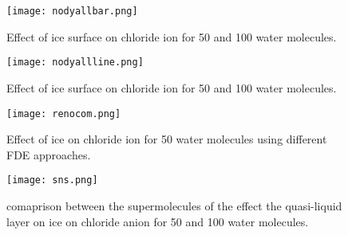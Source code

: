 \documentclass[a4paper,11pt]{report}
\begin{document}
\begin{figure}[H]\large
\texttt{[image: nodyallbar.png]}
\caption{Effect of ice surface on chloride ion for 50 and 100 water molecules.}
\label{figure45}
\end{figure}

\begin{figure}[H]\large
\texttt{[image: nodyallline.png]}
\caption{Effect of ice surface on chloride ion for 50 and 100 water molecules.}
\label{figure46}
\end{figure}

\begin{figure}[H]\large
\texttt{[image: renocom.png]}
\caption{Effect of ice on chloride ion for 50 water molecules using different FDE approaches.}
\label{figure47}
\end{figure}

\begin{figure}[H]\large
\texttt{[image: sns.png]}
\caption{comaprison between the supermolecules of the effect the quasi-liquid layer on ice on chloride anion for 50 and 100 water molecules.}
\label{figure48}
\end{figure}
\end{document}
